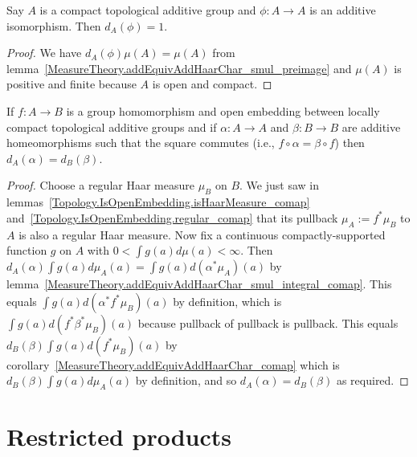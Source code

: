 \begin{lemma}
  \label{MeasureTheory.mulEquivHaarChar_eq_one_of_compactSpace}
  \leanok
  Say $A$ is a compact topological additive group and $\phi:A\to A$ is an additive isomorphism.
Then $d_A(\phi)=1.$
\end{lemma}
\begin{proof}
  \leanok
  We have $d_A(\phi)\mu(A)=\mu(A)$
  from lemma~\ref{MeasureTheory.addEquivAddHaarChar_smul_preimage}
  and $\mu(A)$ is positive and finite because $A$ is open and compact.
\end{proof}

\begin{lemma}
  \label{MeasureTheory.addEquivAddHaarChar_eq_addEquivAddHaarChar_of_isOpenEmbedding}
  \leanok
  If $f:A\to B$ is a group homomorphism and open embedding between locally compact
  topological additive groups and if $\alpha:A\to A$ and $\beta:B\to B$ are additive
  homeomorphisms such that the square commutes (i.e., $f\circ\alpha=\beta\circ f$)
  then $d_A(\alpha)=d_B(\beta)$.
\end{lemma}
\begin{proof}
  \leanok
  Choose a regular Haar measure $\mu_B$ on $B$. We just saw
  in lemmas~\ref{Topology.IsOpenEmbedding.isHaarMeasure_comap}
  and~\ref{Topology.IsOpenEmbedding.regular_comap} that its pullback
  $\mu_A:=f^*\mu_B$ to $A$ is also a regular Haar
  measure. Now fix a continuous compactly-supported function $g$ on $A$ with
  $0<\int g(a)d\mu(a)<\infty$. Then $d_A(\alpha)\int g(a)d\mu_A(a)=\int g(a)d(\alpha^*\mu_A)(a)$
  by lemma~\ref{MeasureTheory.addEquivAddHaarChar_smul_integral_comap}.
  This equals $\int g(a)d(\alpha^* f^*\mu_B)(a)$ by definition,
  which is $\int g(a)d(f^*\beta^*\mu_B)(a)$ because pullback of pullback is pullback.
  This equals $d_B(\beta)\int g(a) d(f^*\mu_B)(a)$ by
  corollary~\ref{MeasureTheory.addEquivAddHaarChar_comap}
  which is $d_B(\beta)\int g(a)d\mu_A(a)$ by definition,
  and so $d_A(\alpha)=d_B(\beta)$ as required.
\end{proof}

\section{Restricted products}

